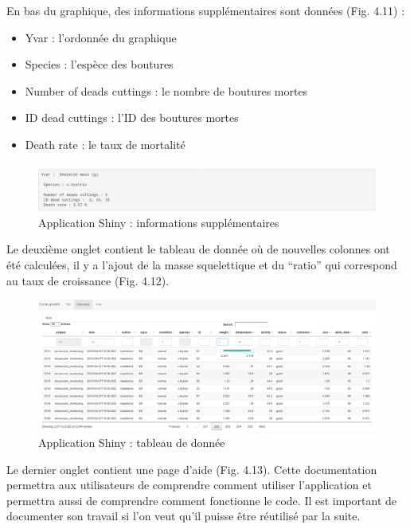 \documentclass[]{article}
\providecommand{\tightlist}{%
  \setlength{\itemsep}{0pt}\setlength{\parskip}{0pt}}
\begin{document}
En bas du graphique, des informations supplémentaires sont données (Fig.
4.11) :

\begin{itemize}
\tightlist
\item
  Yvar : l'ordonnée du graphique
\item
  Species : l'espèce des boutures
\item
  Number of deads cuttings : le nombre de boutures mortes
\item
  ID dead cuttings : l'ID des boutures mortes
\item
  Death rate : le taux de mortalité
\end{itemize}

\begin{figure}[h!]
\includegraphics[]{../image/verbatim.PNG}
\caption{Application Shiny : informations supplémentaires}
\end{figure}

Le deuxième onglet contient le tableau de donnée où de nouvelles
colonnes ont été calculées, il y a l'ajout de la masse squelettique et
du ``ratio'' qui correspond au taux de croissance (Fig. 4.12).

\begin{figure}[h!]
\includegraphics[]{../image/notebook-table1.png}
\caption{Application Shiny : tableau de donnée}
\end{figure}

Le dernier onglet contient une page d'aide (Fig. 4.13). Cette
documentation permettra aux utilisateurs de comprendre comment utiliser
l'application et permettra aussi de comprendre comment fonctionne le
code. Il est important de documenter son travail si l'on veut qu'il
puisse être réutilisé par la suite.
\end{document}
